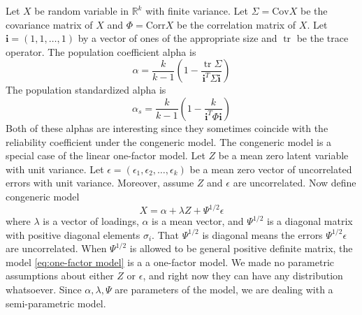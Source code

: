 \documentclass{article}
\theoremstyle{plain}
\theoremstyle{plain}
\theoremstyle{definition}
\theoremstyle{remark}
\theoremstyle{definition}
\theoremstyle{plain}
\theoremstyle{plain}
\theoremstyle{definition}
\DeclareMathOperator{\tr}{tr}
\begin{document}
Let $X$ be random variable in $\mathbb{R}^{k}$ with finite variance.
Let $\Sigma=\textrm{Cov}X$ be the covariance matrix of $X$ and $\Phi=\textrm{Corr}X$
be the correlation matrix of $X$. Let $\mathbf{i}=\left(1,1,\ldots,1\right)$ by a vector of ones of the appropriate size and $\tr$ be the trace operator.
The population coefficient alpha \citep[][eq. 2]{cronbach1951coefficient} is
\begin{equation}
\alpha =  \frac{k}{k-1}\left(1-\frac{\tr\Sigma}{\mathbf{i}^{T}\Sigma\mathbf{i}}\right)\label{eq:Coefficient alpha}
\end{equation}
The population standardized alpha \citep[][eq. 2]{Falk2011-ae} is
\begin{equation}
\alpha_s=\frac{k}{k-1}\left(1-\frac{k}{\mathbf{i}^{T}\Phi\mathbf{i}}\right)\label{eq:standardized alpha}
\end{equation}
Both of these alphas are interesting since they sometimes coincide with the reliability coefficient under the congeneric model. 
The congeneric model is a special case of the linear one-factor model. Let $Z$ be a mean zero latent variable with unit variance. Let $\epsilon=\left(\epsilon_{1},\epsilon_{2},\ldots,\epsilon_{k}\right)$
be a mean zero vector of uncorrelated errors with unit variance. Moreover, assume $Z$ and $\epsilon$ are uncorrelated. Now define congeneric model
\begin{equation}
X=\alpha + \lambda Z+\Psi^{1/2}\epsilon\label{eq:one-factor model}
\end{equation}
where $\lambda$ is a vector of loadings, $\alpha$ is a mean vector, and $\Psi^{1/2}$ is a diagonal matrix with positive diagonal elements $\sigma_i$. That $\Psi^{1/2}$ is diagonal means the errors $\Psi^{1/2}\epsilon$ are uncorrelated. When $\Psi^{1/2}$ is allowed to be general positive definite matrix, the model \eqref{eq:one-factor model} is a a one-factor model. We made no parametric assumptions about either $Z$ or $\epsilon$, and right now they can have any distribution whatsoever. Since $\alpha,\lambda,\Psi$ are parameters of the model, we are dealing with a semi-parametric model.
\end{document}
